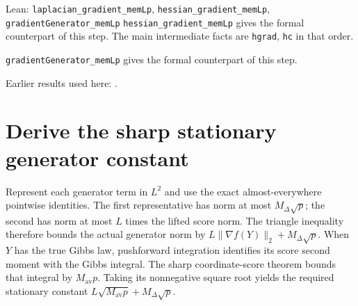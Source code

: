 \documentclass[11pt,a4paper]{article}
\begin{document}
\begin{leanbox}{Lean: \texttt{laplacian\_\allowbreak{}gradient\_\allowbreak{}memLp}, \texttt{hessian\_\allowbreak{}gradient\_\allowbreak{}memLp}, \texttt{gradientGenerator\_\allowbreak{}memLp}}
\texttt{hessian\_\allowbreak{}gradient\_\allowbreak{}mem\allowbreak{}Lp} gives the formal counterpart of this step. The main intermediate facts are \texttt{hgrad}, \texttt{hc} in that order.




\texttt{gradient\allowbreak{}Generator\_\allowbreak{}mem\allowbreak{}Lp} gives the formal counterpart of this step.
\end{leanbox}


Earlier results used here: \cite[Section~3.13.4]{LangevinLean2026ULASC}.

\section{\texorpdfstring{Derive the sharp stationary generator constant}{Derive the sharp stationary generator constant}}


Represent each generator term in \(L^{2}\) and use the exact almost-everywhere pointwise identities. The first representative has norm at most \(M_\Delta \sqrt p\); the second has norm at most \(L\) times the lifted score norm. The triangle inequality therefore bounds the actual generator norm by \(L\|\nabla f(Y)\|_{2}+M_\Delta \sqrt p\). When \(Y\) has the true Gibbs law, pushforward integration identifies its score second moment with the Gibbs integral. The sharp coordinate-score theorem bounds that integral by \(M_{\mathrm{av}}p\). Taking its nonnegative square root yields the required stationary constant \(L\sqrt{M_{\mathrm{av}}p}+M_\Delta\sqrt p\).
\end{document}
